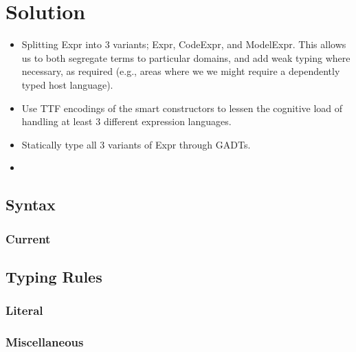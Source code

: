 \section{Solution}

\begin{itemize}
    
    \item Splitting Expr into 3 variants; Expr, CodeExpr, and ModelExpr.
          This allows us to both segregate terms to particular domains, and add
          weak typing where necessary, as required (e.g., areas where we we might
          require a dependently typed host language).
    
    \item Use TTF encodings of the smart constructors to lessen the cognitive
          load of handling at least 3 different expression languages.

    \item Statically type all 3 variants of Expr through GADTs.

    \item {}

\end{itemize}

\subsection{Syntax}

\subsubsection{Current}



\subsection{Typing Rules}

\subsubsection{Literal}



\subsubsection{Miscellaneous}

